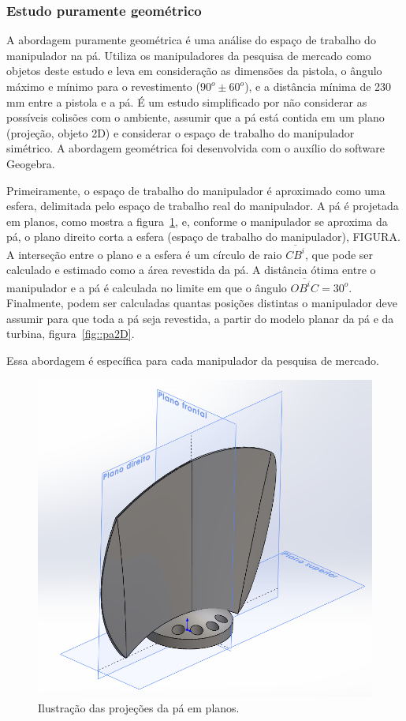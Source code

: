 \subsubsection{Estudo puramente geométrico}
A abordagem puramente geométrica é uma análise do espaço de trabalho do
manipulador na pá. Utiliza os manipuladores da pesquisa de mercado como
objetos deste estudo e leva em consideração as dimensões da
pistola, o ângulo máximo e mínimo para o revestimento ($90^o \pm 60^o$), e a
distância mínima de 230 mm entre a pistola e a pá. É um estudo simplificado por não considerar as possíveis colisões com o ambiente, assumir
que a pá está contida em um plano (projeção, objeto 2D) e considerar o espaço
de trabalho do manipulador simétrico. A abordagem geométrica foi desenvolvida
com o auxílio do software Geogebra.

Primeiramente, o espaço de trabalho do manipulador é aproximado
como uma esfera, delimitada pelo espaço de
trabalho real do manipulador. A pá é projetada em planos, como mostra a
figura~\ref{fig::paplanos}, e, conforme o manipulador se aproxima da pá, o plano
direito corta a esfera (espaço de trabalho do manipulador), FIGURA. A interseção
entre o plano e a esfera é um círculo de raio $\overline{CB^i}$, que pode ser
calculado e estimado como a área revestida da pá. A distância ótima entre o
manipulador e a pá é calculada no limite em que o ângulo
$\overline{OB^iC}=30^o$. Finalmente, podem ser calculadas quantas posições
distintas o manipulador deve assumir para que toda a pá seja revestida, a partir
do modelo planar da pá e da turbina, figura~\ref{fig::pa2D}.

Essa abordagem é específica para cada manipulador da pesquisa de mercado.

\begin{figure}[h!]	
	\includegraphics[width=\columnwidth]{figs/bighatch/PaPlanos.PNG}
	\caption{Ilustração das projeções da pá em planos.}
	\label{fig::paplanos}
\end{figure}

